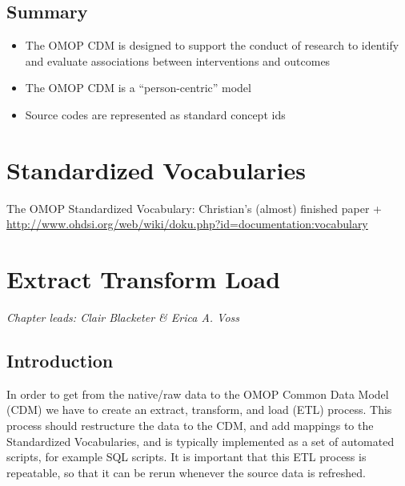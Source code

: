 \documentclass[11pt]{book}
\theoremstyle{definition}
\theoremstyle{definition}
\theoremstyle{definition}
\theoremstyle{remark}
\let\BeginKnitrBlock\begin \let\EndKnitrBlock\end
\begin{document}
\hypertarget{summary-2}{%
\section{Summary}\label{summary-2}}

\BeginKnitrBlock{rmdsummary}
\begin{itemize}
\item
  The OMOP CDM is designed to support the conduct of research to identify and evaluate associations between interventions and outcomes
\item
  The OMOP CDM is a ``person-centric'' model
\item
  Source codes are represented as standard concept ids
\end{itemize}
\EndKnitrBlock{rmdsummary}

\hypertarget{StandardizedVocabularies}{%
\chapter{Standardized Vocabularies}\label{StandardizedVocabularies}}

The OMOP Standardized Vocabulary: Christian's (almost) finished paper + \url{http://www.ohdsi.org/web/wiki/doku.php?id=documentation:vocabulary}

\hypertarget{ExtractTransformLoad}{%
\chapter{Extract Transform Load}\label{ExtractTransformLoad}}

\emph{Chapter leads: Clair Blacketer \& Erica A. Voss}

\hypertarget{introduction-1}{%
\section{Introduction}\label{introduction-1}}

In order to get from the native/raw data to the OMOP Common Data Model (CDM) we have to create an extract, transform, and load (ETL) process. This process should restructure the data to the CDM, and add mappings to the Standardized Vocabularies, and is typically implemented as a set of automated scripts, for example SQL scripts. It is important that this ETL process is repeatable, so that it can be rerun whenever the source data is refreshed.    
\end{document}
